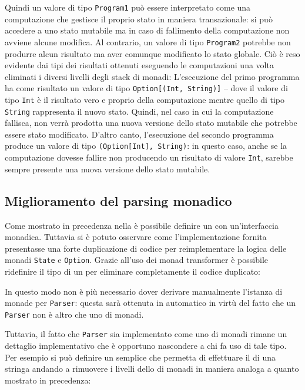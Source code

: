 Quindi un valore di tipo \lstinline{Program1} può essere interpretato come una computazione che gestisce il proprio stato in maniera transazionale: si può accedere a uno stato mutabile ma in caso di fallimento della computazione non avviene alcune modifica. Al contrario, un valore di tipo \lstinline{Program2} potrebbe non produrre alcun risultato ma aver comunque modificato lo stato globale. Ciò è reso evidente dai tipi dei risultati ottenuti eseguendo le computazioni una volta eliminati i diversi livelli degli stack di monadi:
L'esecuzione del primo programma ha come risultato un valore di tipo \lstinline{Option[(Int, String)]} -- dove il valore di tipo \lstinline{Int} è il risultato vero e proprio della computazione mentre quello di tipo \lstinline{String} rappresenta il nuovo stato. Quindi, nel caso in cui la computazione fallisca, non verrà prodotta una nuova versione dello stato mutabile che potrebbe essere stato modificato.
D'altro canto, l'esecuzione del secondo programma produce un valore di tipo \lstinline{(Option[Int], String)}: in questo caso, anche se la computazione dovesse fallire non producendo un risultato di valore \lstinline{Int}, sarebbe sempre presente una nuova versione dello stato mutabile.

\subsection{Miglioramento del parsing monadico}
Come mostrato in precedenza nella  è possibile definire un  con un'interfaccia monadica. Tuttavia si è potuto osservare come l'implementazione fornita presentasse una forte duplicazione di codice per reimplementare la logica delle monadi \lstinline{State} e \lstinline{Option}.
Grazie all'uso dei monad transformer è possibile ridefinire il tipo di un  per eliminare completamente il codice duplicato:

In questo modo non è più necessario dover derivare manualmente l'istanza di monade per \lstinline{Parser}: questa sarà ottenuta in automatico in virtù del fatto che un \lstinline{Parser} non è altro che uno  di monadi.

Tuttavia, il fatto che \lstinline{Parser} sia implementato come uno  di monadi rimane un dettaglio implementativo che è opportuno nascondere a chi fa uso di tale tipo. Per esempio si può definire un semplice  che permetta di effettuare il  di una stringa andando a rimuovere i livelli dello  di monadi in maniera analoga a quanto mostrato in precedenza:

